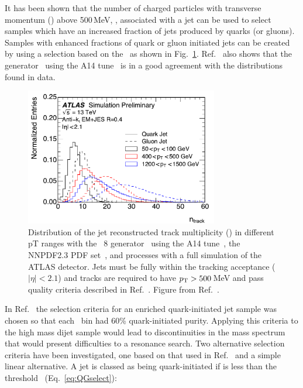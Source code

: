 
It has been shown that the number of charged particles with transverse
momentum (\pT ) above 500\,MeV, \ntrk, associated with a jet can be used
to select samples which have an increased fraction of jets produced by
quarks (or gluons). Samples with enhanced fractions of quark or gluon
initiated jets can be created by using a selection based on the \ntrk\
as shown in Fig.~\ref{fig:jet_pt_quark_gluon}.
Ref.~\cite{ATL-PHYS-PUB-2017-009} also shows that the 
generator~\cite{pythia8} using the A14 tune~\cite{A14tune} is in a good
agreement with the distributions found in data.


\begin{figure}[htb]
 \centering
\includegraphics[width=0.75\textwidth]{figures/tagging/fig_01_ATL-PHYS-PUB-2017-009.pdf}
\caption{Distribution of the jet reconstructed track multiplicity (\ntrk ) in
 different pT ranges with the \Pythia~8 generator~\cite{pythia8} using
 the A14 tune~\cite{A14tune}, the NNPDF2.3 PDF
 set~\cite{Carrazza:2013axa}, and processes with a full simulation of the
 ATLAS detector. Jets must be fully within the tracking acceptance
 ($|\eta|<2.1$) and tracks are required to have $p_{\mathrm T} > 500$\,MeV and pass
  quality criteria described in Ref.~\cite{ATL-PHYS-PUB-2017-009}. Figure
 from Ref.~\cite{ATL-PHYS-PUB-2017-009}. \label{fig:jet_pt_quark_gluon}}
\end{figure}

In Ref.~\cite{ATL-PHYS-PUB-2017-009}  the selection criteria for  an enriched quark-initiated jet sample was chosen so that 
each \pT\ bin had 60\% quark-initiated purity. Applying this criteria to the high mass dijet sample would lead to 
discontinuities in the mass spectrum that would present difficulties to a resonance search. Two alternative selection
criteria have been investigated, one based on that used in Ref.~\cite{ATL-PHYS-PUB-2017-009} and a simple linear
alternative. A jet is classed as being quark-initiated if \ntrk is less than the threshold \nqg\ (Eq.~\ref{eq:QGselect}):

